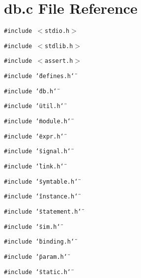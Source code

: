 \section{db.c File Reference}
\label{db_8c}
{\tt \#include $<$stdio.h$>$}\par
{\tt \#include $<$stdlib.h$>$}\par
{\tt \#include $<$assert.h$>$}\par
{\tt \#include \char`\"{}defines.h\char`\"{}}\par
{\tt \#include \char`\"{}db.h\char`\"{}}\par
{\tt \#include \char`\"{}util.h\char`\"{}}\par
{\tt \#include \char`\"{}module.h\char`\"{}}\par
{\tt \#include \char`\"{}expr.h\char`\"{}}\par
{\tt \#include \char`\"{}signal.h\char`\"{}}\par
{\tt \#include \char`\"{}link.h\char`\"{}}\par
{\tt \#include \char`\"{}symtable.h\char`\"{}}\par
{\tt \#include \char`\"{}instance.h\char`\"{}}\par
{\tt \#include \char`\"{}statement.h\char`\"{}}\par
{\tt \#include \char`\"{}sim.h\char`\"{}}\par
{\tt \#include \char`\"{}binding.h\char`\"{}}\par
{\tt \#include \char`\"{}param.h\char`\"{}}\par
{\tt \#include \char`\"{}static.h\char`\"{}}\par
